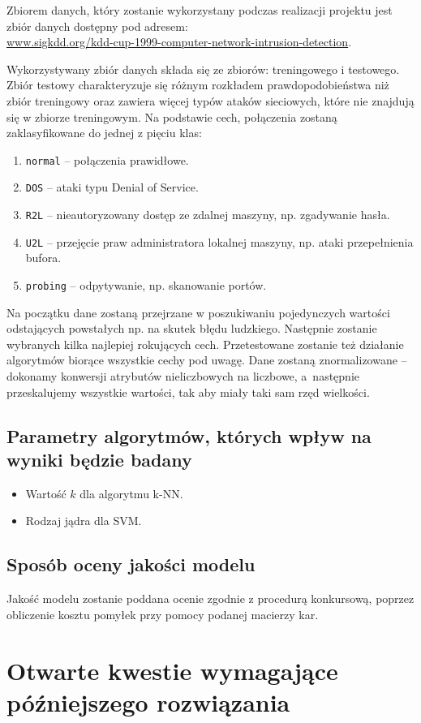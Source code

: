 \documentclass[a4paper, 12pt]{article}
\begin{document}
Zbiorem danych, który zostanie wykorzystany podczas realizacji projektu jest zbiór danych dostępny 
pod adresem: \\
\url{www.sigkdd.org/kdd-cup-1999-computer-network-intrusion-detection}.

Wykorzystywany zbiór danych składa się ze zbiorów: treningowego i testowego. 
Zbiór testowy charakteryzuje się różnym rozkładem prawdopodobieństwa niż zbiór treningowy oraz 
zawiera więcej typów ataków sieciowych, które nie znajdują się w zbiorze treningowym.
Na podstawie cech, połączenia zostaną zaklasyfikowane do jednej z pięciu klas:

\begin{enumerate}
 \item \texttt{normal} -- połączenia prawidłowe.
 \item \texttt{DOS} -- ataki typu Denial of Service.
 \item \texttt{R2L} -- nieautoryzowany dostęp ze zdalnej maszyny, np. zgadywanie hasła.
 \item \texttt{U2L} -- przejęcie praw administratora lokalnej maszyny, np. ataki przepełnienia bufora.
 \item \texttt{probing} -- odpytywanie, np. skanowanie portów.
\end{enumerate}

Na początku dane zostaną przejrzane w poszukiwaniu pojedynczych wartości odstających
powstałych np. na skutek błędu ludzkiego. Następnie zostanie wybranych kilka najlepiej rokujących
cech. Przetestowane zostanie też działanie algorytmów biorące wszystkie cechy pod uwagę.
Dane zostaną znormalizowane -- dokonamy konwersji atrybutów nieliczbowych na liczbowe,
a~następnie przeskalujemy wszystkie wartości, tak aby miały taki sam rzęd wielkości.

\subsection{Parametry algorytmów, których wpływ na wyniki będzie badany}

\begin{itemize}
 \item Wartość $k$ dla algorytmu k-NN.
 \item Rodzaj jądra dla SVM.
\end{itemize}

\subsection{Sposób oceny jakości modelu}
Jakość modelu zostanie poddana ocenie zgodnie z procedurą konkursową,
poprzez obliczenie kosztu pomyłek przy pomocy podanej macierzy kar.


\section{Otwarte kwestie wymagające późniejszego rozwiązania}
\end{document}
